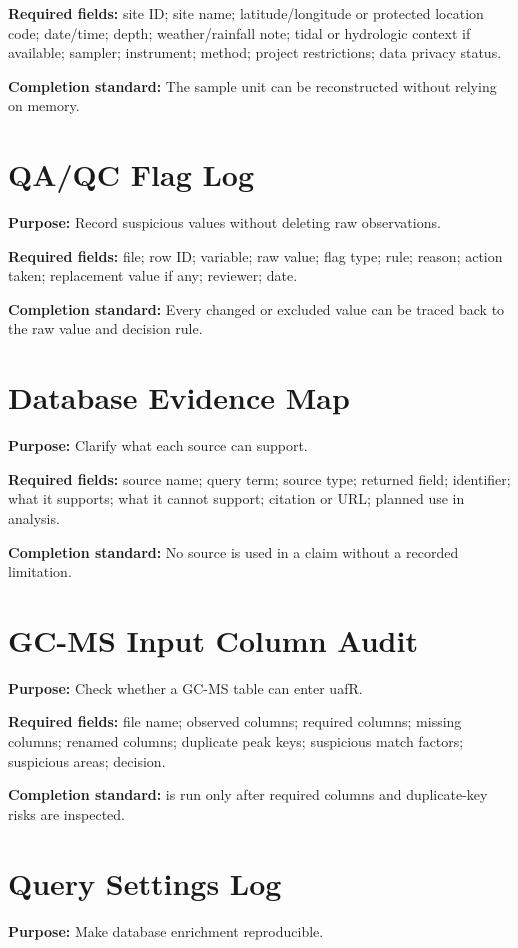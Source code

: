 \textbf{Required fields:} site ID; site name; latitude/longitude or protected location code; date/time; depth; weather/rainfall note; tidal or hydrologic context if available; sampler; instrument; method; project restrictions; data privacy status.

\textbf{Completion standard:} The sample unit can be reconstructed without relying on memory.

\section{QA/QC Flag Log}
\textbf{Purpose:} Record suspicious values without deleting raw observations.

\textbf{Required fields:} file; row ID; variable; raw value; flag type; rule; reason; action taken; replacement value if any; reviewer; date.

\textbf{Completion standard:} Every changed or excluded value can be traced back to the raw value and decision rule.

\section{Database Evidence Map}
\textbf{Purpose:} Clarify what each source can support.

\textbf{Required fields:} source name; query term; source type; returned field; identifier; what it supports; what it cannot support; citation or URL; planned use in analysis.

\textbf{Completion standard:} No source is used in a claim without a recorded limitation.

\section{GC-MS Input Column Audit}
\textbf{Purpose:} Check whether a GC-MS table can enter uafR.

\textbf{Required fields:} file name; observed columns; required columns; missing columns; renamed columns; duplicate peak keys; suspicious match factors; suspicious areas; decision.

\textbf{Completion standard:}  is run only after required columns and duplicate-key risks are inspected.

\section{Query Settings Log}
\textbf{Purpose:} Make database enrichment reproducible.

